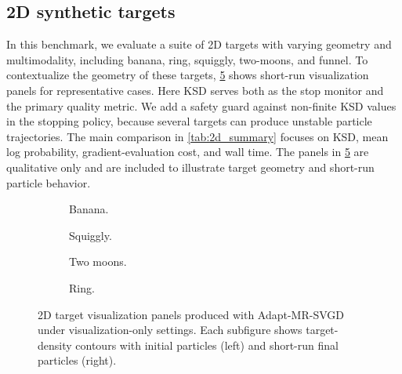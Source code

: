 \subsection{2D synthetic targets}
In this benchmark, we evaluate a suite of 2D targets with varying geometry and multimodality, including banana, ring, squiggly, two-moons, and funnel.
To contextualize the geometry of these targets, \cref{fig:2d_demo_panel} shows
short-run visualization panels for representative cases.
Here KSD serves both as the stop monitor and the
primary quality metric. We add a safety guard against non-finite KSD values in
the stopping policy, because several targets can produce unstable particle
trajectories. The main comparison in \cref{tab:2d_summary} focuses on KSD, mean
log probability, gradient-evaluation cost, and wall time. The panels in
\cref{fig:2d_demo_panel} are qualitative only and are included to illustrate
target geometry and short-run particle behavior.

\begin{figure}[t]
  \centering
  \begin{subfigure}[t]{0.84\linewidth}
    \centering
    \caption{Banana.}
    \label{fig:2d_demo_banana}
  \end{subfigure}

  \vspace{0.15em}

  \begin{subfigure}[t]{0.84\linewidth}
    \centering
    \caption{Squiggly.}
    \label{fig:2d_demo_squiggly}
  \end{subfigure}

  \vspace{0.15em}

  \begin{subfigure}[t]{0.84\linewidth}
    \centering
    \caption{Two moons.}
    \label{fig:2d_demo_two_moons}
  \end{subfigure}

  \vspace{0.15em}

  \begin{subfigure}[t]{0.84\linewidth}
    \centering
    \caption{Ring.}
    \label{fig:2d_demo_ring}
  \end{subfigure}

  \caption{2D target visualization panels produced with Adapt-MR-SVGD under
  visualization-only settings. Each subfigure shows target-density contours with
  initial particles (left) and short-run final particles (right).}
  \label{fig:2d_demo_panel}
\end{figure}

